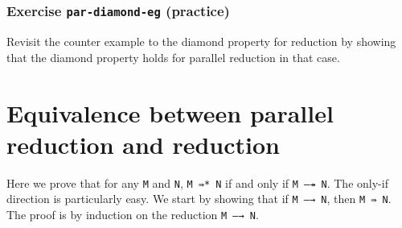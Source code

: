 \begin{fence}
\begin{code}
\AgdaSymbol{:}\AgdaSpace{}%
\AgdaSpace{}%
\AgdaSpace{}%
\AgdaSymbol{)}\AgdaSpace{}%
\AgdaSymbol{\{}\AgdaSpace{}%
\AgdaSpace{}%
\AgdaSymbol{:}\AgdaSpace{}%
\AgdaSpace{}%
\AgdaSpace{}%
\AgdaSymbol{\}}\<%
\\
\>[2][@{}l@{\AgdaIndent{0}}]%
\>[4]\AgdaSpace{}%
\AgdaSpace{}%
\AgdaSpace{}%
\<%
\\
%
\>[4]%
\>[236I]\AgdaSpace{}%
\AgdaSpace{}%
\<%
\\
\>[.][@{}l@{}]\<[236I]%
\>[6]\AgdaComment{---------}\<%
\\
%
\>[4]\AgdaSpace{}%
\AgdaSpace{}%
\AgdaSpace{}%
\<%
\end{code}
\end{fence}

\hypertarget{exercise-par-diamond-eg-practice}{%
\subsubsection{\texorpdfstring{Exercise \texttt{par-diamond-eg}
(practice)}{Exercise par-diamond-eg (practice)}}\label{exercise-par-diamond-eg-practice}}

Revisit the counter example to the diamond property for reduction by
showing that the diamond property holds for parallel reduction in that
case.

\begin{fence}
\begin{code}%
\>[0]\<%
\end{code}
\end{fence}

\hypertarget{equivalence-between-parallel-reduction-and-reduction}{%
\section{Equivalence between parallel reduction and
reduction}\label{equivalence-between-parallel-reduction-and-reduction}}

Here we prove that for any \texttt{M} and \texttt{N}, \texttt{M\ ⇛*\ N}
if and only if \texttt{M\ —↠\ N}. The only-if direction is particularly
easy. We start by showing that if \texttt{M\ —→\ N}, then
\texttt{M\ ⇛\ N}. The proof is by induction on the reduction
\texttt{M\ —→\ N}.

